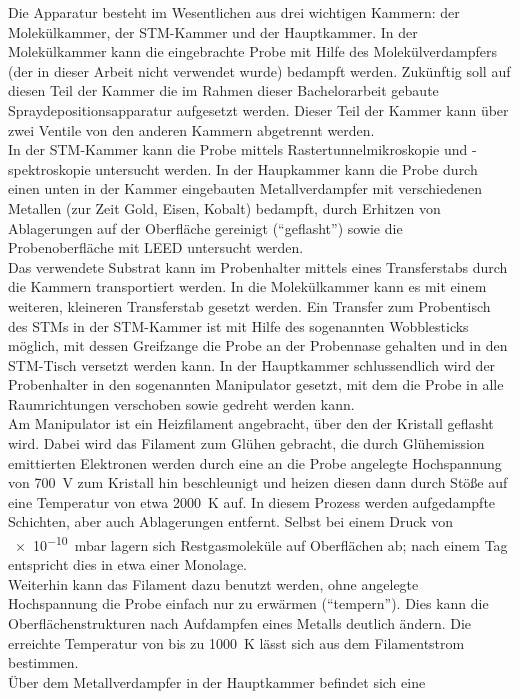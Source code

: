 Die Apparatur besteht im Wesentlichen aus drei wichtigen Kammern: 
der 
Molekülkammer, der STM-Kammer und der Hauptkammer. In der Molekülkammer kann die eingebrachte
Probe mit Hilfe des Molekülverdampfers (der in dieser Arbeit nicht verwendet wurde) bedampft werden.
Zukünftig soll auf diesen Teil der Kammer die im Rahmen dieser Bachelorarbeit gebaute
Spraydepositionsapparatur aufgesetzt werden. Dieser Teil der Kammer kann über zwei Ventile von den
anderen Kammern abgetrennt werden.
\\
In der STM-Kammer kann die Probe
mittels Rastertunnelmikroskopie und -spektroskopie untersucht werden. In der Haupkammer kann die
Probe durch einen unten in der Kammer eingebauten Metallverdampfer mit
verschiedenen Metallen (zur Zeit Gold, Eisen, Kobalt) bedampft, durch Erhitzen von Ablagerungen auf
der Oberfläche gereinigt ("`geflasht"') sowie die Probenoberfläche mit LEED untersucht werden. 
\\
Das verwendete Substrat kann im Probenhalter mittels eines
Transferstabs durch die Kammern transportiert werden. In die Molekülkammer kann es mit einem
weiteren, kleineren Transferstab gesetzt werden. Ein Transfer zum Probentisch des STMs in der
STM-Kammer ist mit Hilfe des sogenannten Wobblesticks möglich, mit dessen Greifzange die Probe an der Probennase gehalten und in
den STM-Tisch versetzt werden kann. In der Hauptkammer schlussendlich wird der Probenhalter in den
sogenannten Manipulator gesetzt, mit dem die Probe in alle Raumrichtungen verschoben sowie gedreht
werden kann. 
\\
Am Manipulator ist ein Heizfilament angebracht, über den der Kristall geflasht wird.
Dabei wird das Filament zum Glühen gebracht, die durch Glühemission emittierten Elektronen werden
durch eine an die Probe angelegte Hochspannung von \SI{700}{V} zum Kristall hin beschleunigt und
heizen diesen dann durch Stöße auf eine Temperatur von etwa \SI{2000}{K} auf. In diesem Prozess
werden aufgedampfte Schichten, aber auch Ablagerungen entfernt. Selbst bei einem Druck von \SI{e-10}{mbar} lagern sich
Restgasmoleküle auf Oberflächen ab; nach einem Tag entspricht dies in etwa einer Monolage.
\\
Weiterhin kann das Filament dazu benutzt werden, ohne angelegte Hochspannung die Probe einfach nur
zu erwärmen ("`tempern"'). Dies kann die Oberflächenstrukturen nach Aufdampfen eines Metalls
deutlich ändern. Die erreichte Temperatur von bis zu \SI{1000}{K} lässt sich aus dem Filamentstrom
bestimmen.
\\
 Über dem Metallverdampfer in der Hauptkammer befindet sich eine
